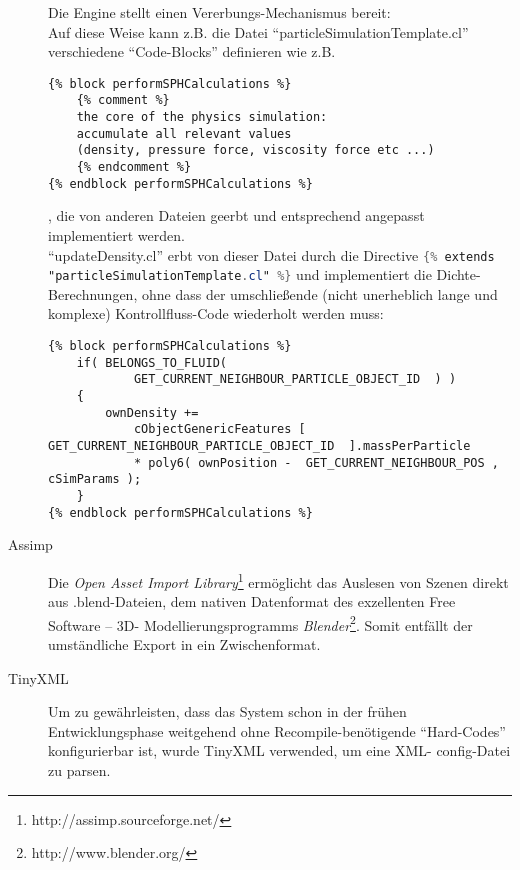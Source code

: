 \begin{description}
       		Die Engine stellt einen Vererbungs-Mechanismus bereit:\\
       		Auf diese Weise kann z.B. die Datei "`particleSimulationTemplate.cl"' verschiedene "`Code-Blocks"'
       		definieren wie z.B.
       		
       		\begin{lstlisting}
{% block performSPHCalculations %}
	{% comment %}
	the core of the physics simulation: 
	accumulate all relevant values 
	(density, pressure force, viscosity force etc ...)
	{% endcomment %}               
{% endblock performSPHCalculations %}
       		\end{lstlisting}
       		
       		, die von anderen Dateien geerbt und entsprechend angepasst implementiert werden.\\
       		"`updateDensity.cl"' erbt von dieser Datei durch die Directive
       		\lstinline[language=GLSL]|{% extends "particleSimulationTemplate.cl" %}| 
       		und implementiert die Dichte-Berechnungen, 
       		ohne dass der umschließende (nicht unerheblich lange und komplexe) Kontrollfluss-Code wiederholt werden muss:
       		\begin{lstlisting}
{% block performSPHCalculations %}
	if( BELONGS_TO_FLUID(
			GET_CURRENT_NEIGHBOUR_PARTICLE_OBJECT_ID  ) )
	{
		ownDensity +=                   
			cObjectGenericFeatures [ GET_CURRENT_NEIGHBOUR_PARTICLE_OBJECT_ID  ].massPerParticle
			* poly6( ownPosition -  GET_CURRENT_NEIGHBOUR_POS , cSimParams );
	}
{% endblock performSPHCalculations %}
       		\end{lstlisting}

       		
       		
    	\item[Assimp]
    	Die \emph{Open Asset Import Library}\footnote{http://assimp.sourceforge.net/} ermöglicht das Auslesen
    	von Szenen direkt aus .blend-Dateien, dem nativen Datenformat des exzellenten Free Software -- 3D-
    	Modellierungsprogramms \emph{Blender}\footnote{http://www.blender.org/}.
    	Somit entfällt der umständliche Export in ein Zwischenformat.

    	
   		\item[TinyXML]
   		Um zu gewährleisten, dass das System schon in der frühen Entwicklungsphase weitgehend ohne 
   		Recompile-benötigende "`Hard-Codes"' konfigurierbar ist, wurde TinyXML verwended, um eine XML-
   		config-Datei zu parsen.    	
    
	
	\end{description}	

